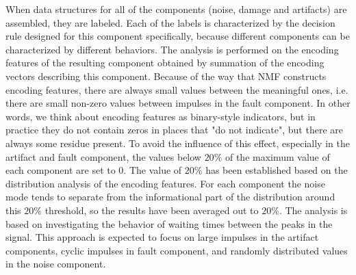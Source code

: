 \documentclass[3p,times]{elsarticle}
\begin{document}
When data structures for all of the components (noise, damage and artifacts) are assembled, they are labeled. Each of the labels is characterized by the decision rule designed for this component specifically, because different components can be characterized by different behaviors. The analysis is performed on the encoding features of the resulting component obtained by summation of the encoding vectors describing this component. Because of the way that NMF constructs encoding features, there are always small values between the meaningful ones, i.e. there are small non-zero values between impulses in the fault component. In other words, we think about encoding features as binary-style indicators, but in practice they do not contain zeros in places that "do not indicate", but there are always some residue present. To avoid the influence of this effect, especially in the artifact and fault component, the values below $20\%$ of the maximum value of each component are set to 0. The value of $20\%$ has been established based on the distribution analysis of the encoding features. For each component the noise mode tends to separate from the informational part of the distribution around this $20\%$ threshold, so the results have been averaged out to $20\%$. The analysis is based on investigating the behavior of waiting times between the peaks in the signal. This approach is expected to focus on large impulses in the artifact components, cyclic impulses in fault component, and randomly distributed values in the noise component.
\end{document}
